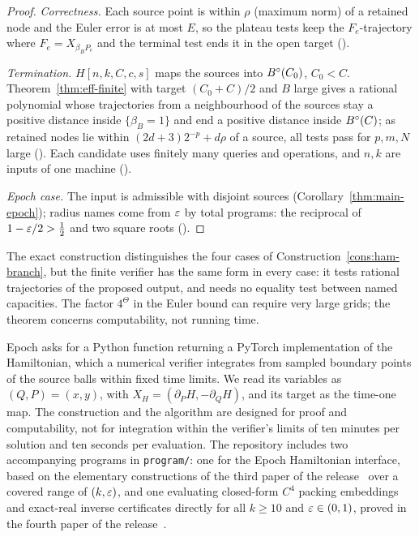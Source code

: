 \begin{proof}
\emph{Correctness.} Each source point is within $\rho$ (maximum norm) of a retained node and the Euler error is at most $E$, so the plateau tests keep the $F_e$-trajectory where $F_e=X_{\beta_BP_e}$ and the terminal test ends it in the open target ().

\emph{Termination.} $H[n,k,C,c,s]$ maps the sources into $B^{\circ}(C_0)$, $C_0<C$. Theorem~\ref{thm:eff-finite} with target $(C_0+C)/2$ and $B$ large gives a rational polynomial whose trajectories from a neighbourhood of the sources stay a positive distance inside $\{\beta_B=1\}$ and end a positive distance inside $B^{\circ}(C)$; as retained nodes lie within $(2d+3)2^{-p}+d\rho$ of a source, all tests pass for $p,m,N$ large (). Each candidate uses finitely many queries and operations, and $n,k$ are inputs of one machine ().

\emph{Epoch case.} The input is admissible with disjoint sources (Corollary~\ref{thm:main-epoch}); radius names come from $\varepsilon$ by total programs: the reciprocal of $1-\varepsilon/2>\frac12$ and two square roots ().
\end{proof}

\begin{remark}\label{rem:eff-branches}\label{rem:eff-size}
The exact construction distinguishes the four cases of Construction~\ref{cons:ham-branch}, but the finite verifier
has the same form in every case: it tests rational trajectories of the proposed output, and needs no equality test
between named capacities. The factor $4^\Theta$ in the Euler bound can require very large grids; the theorem concerns
computability, not running time.
\end{remark}

\begin{remark}\label{rem:eff-epoch-interface}
Epoch \cite{Epoch} asks for a Python function returning a PyTorch implementation of the Hamiltonian, which a numerical
verifier integrates from sampled boundary points of the source balls within fixed time limits. We read its variables as
$(Q,P)=(x,y)$, with $X_H=(\partial_PH,-\partial_QH)$, and its target as the time-one map. The construction and the algorithm are designed for proof and computability, not for integration within the
verifier's limits of ten minutes per solution and ten seconds per evaluation. The repository includes two
accompanying programs in \texttt{program/}: one for the Epoch Hamiltonian interface, based on the elementary
constructions of the third paper of the release~\cite{SongP3} over a covered range of $(k,\varepsilon)$, and one evaluating
closed-form $C^4$ packing embeddings and exact-real inverse certificates directly for all $k\ge10$ and $\varepsilon\in(0,1)$,
proved in the fourth paper of the release~\cite{SongP4}.
\end{remark}
\endgroup
